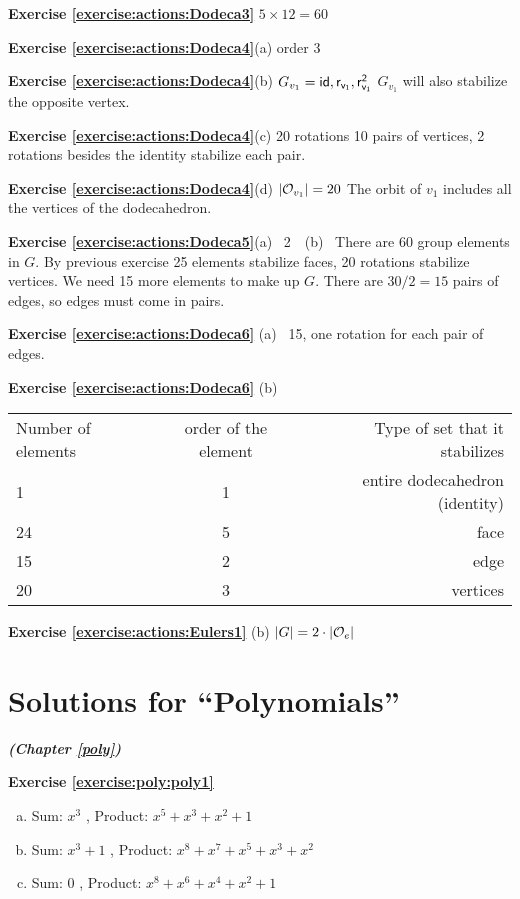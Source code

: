 \noindent\textbf{Exercise \ref{exercise:actions:Dodeca3}}
$5\times 12=60$

\noindent\textbf{Exercise \ref{exercise:actions:Dodeca4}}(a) 
order 3

\noindent\textbf{Exercise \ref{exercise:actions:Dodeca4}}(b) 
$G_{v_1}={\sf{id},r_{v_1},r_{v_1}^2}$ $G_{v_1}$ will also stabilize the opposite vertex.

\noindent\textbf{Exercise \ref{exercise:actions:Dodeca4}}(c) 
 20 rotations 10 pairs of vertices, 2 rotations besides the identity stabilize each pair.

\noindent\textbf{Exercise \ref{exercise:actions:Dodeca4}}(d) 
$|{\cal O}_{v_1}|=20$ The orbit of $v_1$ includes all the vertices of the dodecahedron.

\noindent\textbf{Exercise \ref{exercise:actions:Dodeca5}}(a) ~2~~(b)~
There are 60 group elements in $G$.  By previous exercise 25 elements stabilize faces, 20 rotations stabilize vertices. We need 15 more elements to make up $G$.  There are $30/2=15$ pairs of edges, so edges must come in pairs.

\noindent\textbf{Exercise \ref{exercise:actions:Dodeca6}} (a)~
 15, one rotation for each pair of edges.

\noindent\textbf{Exercise \ref{exercise:actions:Dodeca6}} (b)~

\begin{tabular}{ l c r }
Number of elements & order of the element & Type of set that it stabilizes \\
1 & 1 & entire dodecahedron (identity) \\
24 & 5 & face  \\
15 & 2 & edge \\
20 & 3  & vertices\\
\end{tabular}

\noindent\textbf{Exercise \ref{exercise:actions:Eulers1}} (b)
 $|G|=2\cdot |{\cal O}_e|$

\section{Solutions for ``Polynomials''}
\noindent\textbf{\textit{ (Chapter \ref{poly})}}\bigskip

\noindent\textbf{Exercise \ref{exercise:poly:poly1}}
\begin{enumerate} [(a)]
\item
 Sum: $x^3$ , Product: $x^5+x^3+x^2+1$
\item
 Sum: $x^3+1$ , Product: $x^8+x^7+x^5+x^3+x^2$
\item
 Sum: $0$ , Product: $x^8+x^6+x^4+x^2+1$
\end {enumerate}

